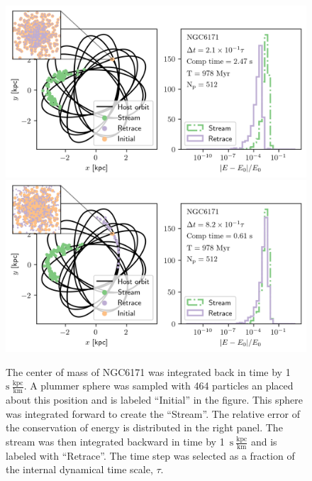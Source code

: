             \begin{figure}
            \centering
            \includegraphics[width=\linewidth]{images/NumericalErrorStreamRetrace_NGC6171_Nsteps_16384_stepsPerTau_4.png}
            \includegraphics[width=\linewidth]{images/NumericalErrorStreamRetrace_NGC6171_Nsteps_4096_stepsPerTau_1.png}
            \caption{The center of mass of NGC6171 was integrated back in time by 1~$\mathrm{s}~\frac{\mathrm{kpc}}{\mathrm{km}}$. A plummer sphere was sampled with 464 particles an placed about this position and is labeled ``Initial'' in the figure. This sphere was integrated forward to create the ``Stream''. The relative error of the conservation of energy is distributed in the right panel. The stream was then integrated backward in time by 1~$\mathrm{s}~\frac{\mathrm{kpc}}{\mathrm{km}}$ and is labeled with ``Retrace''. The time step was selected as a fraction of the internal dynamical time scale, $\tau$. }
            \label{fig:NumericalErrorStreamRetrace_NGC6171_Nsteps_1048576_stepsPerTau_311}
        \end{figure}


